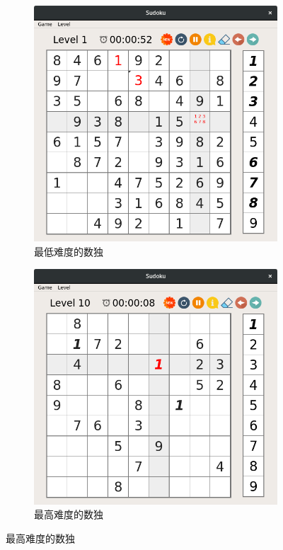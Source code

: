 \documentclass[11pt,a4paper]{article}
\begin{document}
\begin{figure}[H]
	\centering
	\begin{subfigure}{.45\textwidth}
		\centering
		\includegraphics[width=\linewidth]{sudoku-3b.png}
		\caption{最低难度的数独} \label{fig:sudoku-3b}
	\end{subfigure}
	\hfill
	\begin{subfigure}{.45\textwidth}
		\centering
		\includegraphics[width=\linewidth]{sudoku-3c.png}
		\caption{最高难度的数独} \label{fig:sudoku-3c}
	\end{subfigure}


\end{figure}
\end{document}
